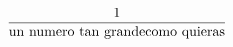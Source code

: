 \documentclass[preview]{standalone}
\begin{document}
\begin{align*}
\frac{1}{\mathrm{un\ numero\ tan\ grande\ \newline como\ quieras}}
\end{align*}
\end{document}
